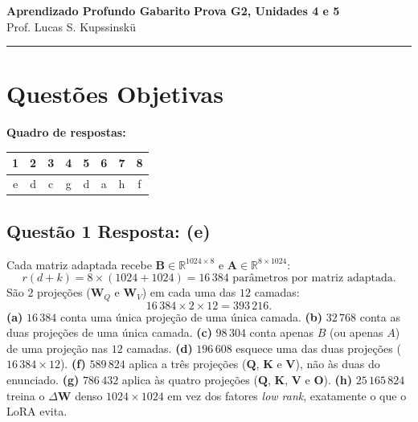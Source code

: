 \documentclass[11pt,a4paper]{article}
\begin{document}
{\Large\bfseries Aprendizado Profundo \textemdash{} Gabarito} \hfill \textbf{Prova G2, Unidades 4 e 5}\\
Prof. Lucas S. Kupssinskü

\rule{\linewidth}{0.8pt}

\section*{Questões Objetivas}

\textbf{Quadro de respostas:}
\begin{center}
\begin{tabular}{|c|c|c|c|c|c|c|c|}
\hline
1 & 2 & 3 & 4 & 5 & 6 & 7 & 8 \\\hline
e & d & c & g & d & a & h & f \\\hline
\end{tabular}
\end{center}

\color{blue}

\subsection*{Questão 1 \textemdash{} Resposta: (e)}
Cada matriz adaptada recebe $\mathbf{B} \in \mathbb{R}^{1024 \times 8}$ e $\mathbf{A} \in \mathbb{R}^{8 \times 1024}$:
\[
r(d + k) = 8 \times (1024 + 1024) = 16\,384 \text{ parâmetros por matriz adaptada}.
\]
São $2$ projeções ($\mathbf{W}_Q$ e $\mathbf{W}_V$) em cada uma das $12$ camadas:
\[
16\,384 \times 2 \times 12 = 393\,216.
\]
\textbf{(a)} $16\,384$ conta uma única projeção de uma única camada.
\textbf{(b)} $32\,768$ conta as duas projeções de uma única camada.
\textbf{(c)} $98\,304$ conta apenas $B$ (ou apenas $A$) de uma projeção nas $12$ camadas.
\textbf{(d)} $196\,608$ esquece uma das duas projeções ($16\,384 \times 12$).
\textbf{(f)} $589\,824$ aplica a três projeções ($\mathbf{Q}$, $\mathbf{K}$ e $\mathbf{V}$), não às duas do enunciado.
\textbf{(g)} $786\,432$ aplica às quatro projeções ($\mathbf{Q}$, $\mathbf{K}$, $\mathbf{V}$ e $\mathbf{O}$).
\textbf{(h)} $25\,165\,824$ treina o $\Delta\mathbf{W}$ denso $1024 \times 1024$ em vez dos fatores \textit{low rank}, exatamente o que o LoRA evita.
\end{document}

